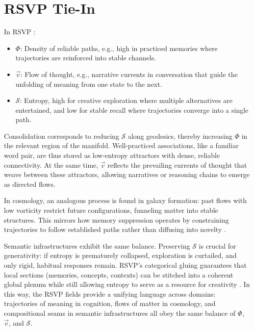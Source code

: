 \documentclass[a4paper,12pt]{article}
\newcommand{\Scal}{\mathcal{S}}
\newcommand{\vvec}{\vec{v}}
\begin{document}
\section{RSVP Tie-In}
In RSVP \citep{semantic2025}:
\begin{itemize}
    \item $\Phi$: Density of reliable paths, e.g., high in practiced memories where trajectories 
    are reinforced into stable channels.
    \item $\vvec$: Flow of thought, e.g., narrative currents in conversation that guide 
    the unfolding of meaning from one state to the next.
    \item $\Scal$: Entropy, high for creative exploration where multiple alternatives are 
    entertained, and low for stable recall where trajectories converge into a single path.
\end{itemize}

Consolidation corresponds to reducing $\Scal$ along geodesics, thereby increasing $\Phi$ in 
the relevant region of the manifold. Well-practiced associations, like a familiar word pair, 
are thus stored as low-entropy attractors with dense, reliable connectivity. At the same time, 
$\vvec$ reflects the prevailing currents of thought that weave between these attractors, 
allowing narratives or reasoning chains to emerge as directed flows. 

In cosmology, an analogous process is found in galaxy formation: past flows with low vorticity 
restrict future configurations, funneling matter into stable structures. This mirrors how 
memory suppression operates by constraining trajectories to follow established paths rather 
than diffusing into novelty \citep{weinberg2008cosmology}. 

Semantic infrastructures exhibit the same balance. Preserving $\Scal$ is crucial for generativity: 
if entropy is prematurely collapsed, exploration is curtailed, and only rigid, habitual responses 
remain. RSVP’s categorical gluing guarantees that local sections (memories, concepts, contexts) 
can be stitched into a coherent global plenum while still allowing entropy to serve as a resource 
for creativity \citep{lurie2009higher}. In this way, the RSVP fields provide a unifying language 
across domains: trajectories of meaning in cognition, flows of matter in cosmology, and 
compositional seams in semantic infrastructures all obey the same balance of $\Phi$, $\vvec$, 
and $\Scal$.
\end{document}
